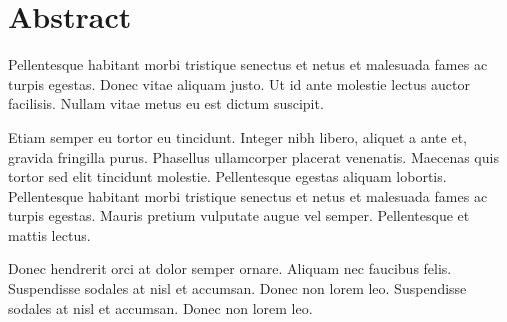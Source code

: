 \chapter*{Abstract}
Pellentesque habitant morbi tristique senectus et netus et malesuada fames ac turpis egestas. Donec vitae aliquam justo. Ut id ante molestie lectus auctor facilisis. Nullam vitae metus eu est dictum suscipit. 

Etiam semper eu tortor eu tincidunt. Integer nibh libero, aliquet a ante et, gravida fringilla purus. Phasellus ullamcorper placerat venenatis. Maecenas quis tortor sed elit tincidunt molestie. Pellentesque egestas aliquam lobortis. Pellentesque habitant morbi tristique senectus et netus et malesuada fames ac turpis egestas. Mauris pretium vulputate augue vel semper. Pellentesque et mattis lectus. 

Donec hendrerit orci at dolor semper ornare. Aliquam nec faucibus felis. Suspendisse sodales at nisl et accumsan. Donec non lorem leo.  Suspendisse sodales at nisl et accumsan. Donec non lorem leo. 